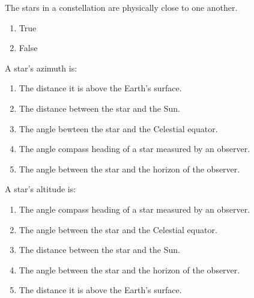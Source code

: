 \documentclass[11pt]{article}
\begin{document}
\begin{enumerate}
\begin{minipage}{\textwidth}
\begin{minipage}{\textwidth}
\end{minipage}
\end{minipage}
\vskip 0.20in

\begin{minipage}{\textwidth}
\begin{minipage}{\textwidth}
\item The stars in a constellation are physically close to one another.
\begin{multicols}{3}
\begin{enumerate} 
\setlength{\itemsep}{1pt} 
\setlength{\parskip}{0pt} 
\setlength{\parsep}{0pt}
\setlength{\multicolsep}{1pt} 
\item True
\item False
\end{enumerate} 
\vfill 
\end{multicols}

\end{minipage}
\end{minipage}
\vskip 0.20in

\begin{minipage}{\textwidth}
\begin{minipage}{\textwidth}
\item A star's azimuth is:
\begin{enumerate} 
\setlength{\itemsep}{1pt} 
\setlength{\parskip}{0pt} 
\setlength{\parsep}{0pt}
\setlength{\multicolsep}{1pt} 
\item The distance it is above the Earth's surface.
\item The distance between the star and the Sun.
\item The angle bewteen the star and the Celestial equator.
\item The angle compass heading of a star measured by an observer.
\item The angle between the star and the horizon of the observer.
\end{enumerate} 
\end{minipage}
\end{minipage}
\vskip 0.20in

\begin{minipage}{\textwidth}
\begin{minipage}{\textwidth}
\item A star's altitude is:
\begin{enumerate} 
\setlength{\itemsep}{1pt} 
\setlength{\parskip}{0pt} 
\setlength{\parsep}{0pt}
\setlength{\multicolsep}{1pt} 
\item The angle compass heading of a star measured by an observer.
\item The angle between the star and the Celestial equator.
\item The distance between the star and the Sun.
\item The angle between the star and the horizon of the observer.
\item The distance it is above the Earth's surface.
\end{enumerate} 
\end{minipage}
\end{minipage}
\vskip 0.20in


\end{enumerate}
\end{document}
